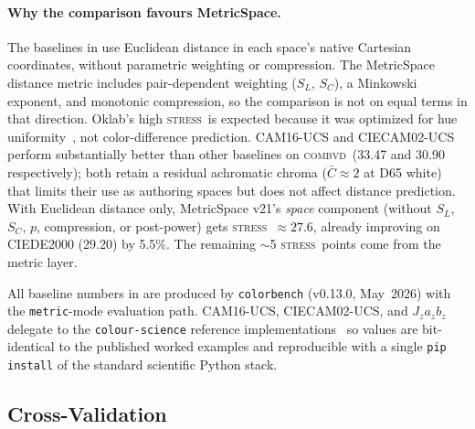 \documentclass[11pt, twocolumn]{article}
\newcommand{\stress}{\textsc{stress}}
\newcommand{\combvd}{\textsc{combvd}}
\begin{document}
\paragraph{Why the comparison favours MetricSpace.}\label{sec:baselines}
The baselines in  use Euclidean distance in each
space's native Cartesian coordinates, without parametric weighting
or compression. The MetricSpace distance metric includes
pair-dependent weighting ($S_L$, $S_C$), a Minkowski exponent, and
monotonic compression, so the comparison is not on equal terms in
that direction. Oklab's high \stress\ is expected because it was
optimized for hue uniformity~\cite{ottosson2020}, not
color-difference prediction. CAM16-UCS and CIECAM02-UCS perform
substantially better than other baselines on \combvd\ (33.47 and
30.90 respectively); both retain a residual achromatic chroma
($\bar{C}\!\approx\!2$ at D65 white) that limits their use as
authoring spaces but does not affect distance prediction.
With Euclidean distance only, MetricSpace v21's \emph{space}
component (without $S_L$, $S_C$, $p$, compression, or post-power)
gets \stress\ $\approx 27.6$, already improving on CIEDE2000
(29.20) by 5.5\%. The remaining $\sim$5 \stress\ points come from
the metric layer.

All baseline numbers in  are produced by
\texttt{colorbench} (v0.13.0, May~2026) with the
\texttt{metric}-mode evaluation path. CAM16-UCS, CIECAM02-UCS, and
$J_z a_z b_z$ delegate to the \texttt{colour-science} reference
implementations~\cite{colour-science} so values are bit-identical
to the published worked examples and reproducible with a single
\texttt{pip install} of the standard scientific Python stack.

\subsection{Cross-Validation}
\end{document}
